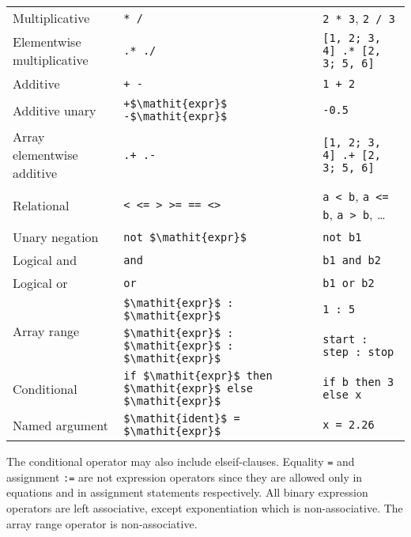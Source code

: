 \begin{table}[H]
\begin{center}
\begin{tabular}{l l l}
\hline
Multiplicative  & \lstinline!* /! & \lstinline!2 * 3!, \lstinline!2 / 3!\\
Elementwise multiplicative & \lstinline!.* ./! & \lstinline![1, 2; 3, 4] .* [2, 3; 5, 6]!\\
\hline
Additive & \lstinline!+ -! & \lstinline!1 + 2!\\
Additive unary & \lstinline!+$\mathit{expr}$ -$\mathit{expr}$! & \lstinline!-0.5!\\
Array elementwise additive & \lstinline!.+ .-! & \lstinline![1, 2; 3, 4] .+ [2, 3; 5, 6]!\\
\hline
Relational & \lstinline!< <= > >= == <>! & \lstinline!a < b!, \lstinline!a <= b!, \lstinline!a > b!, \ldots\\
\hline
Unary negation & \lstinline!not $\mathit{expr}$! & \lstinline!not b1!\\
\hline
Logical and & \lstinline!and! & \lstinline!b1 and b2!\\
\hline
Logical or & \lstinline!or! & \lstinline!b1 or b2!\\
\hline
\multirow{2}{*}{Array range} & \lstinline!$\mathit{expr}$ : $\mathit{expr}$! & \lstinline!1 : 5!\\
                             & \lstinline!$\mathit{expr}$ : $\mathit{expr}$ : $\mathit{expr}$! & \lstinline!start : step : stop!\\
\hline
Conditional & \lstinline!if $\mathit{expr}$ then $\mathit{expr}$ else $\mathit{expr}$! & \lstinline!if b then 3 else x!\\
\hline
Named argument & \lstinline!$\mathit{ident}$ = $\mathit{expr}$! & \lstinline!x = 2.26!\\
\hline
\end{tabular}
\end{center}
\end{table}

The conditional operator may also include elseif-clauses. Equality \lstinline!=! and
assignment \lstinline!:=! are not expression operators since they are allowed only
in equations and in assignment statements respectively. All binary
expression operators are left associative, except exponentiation which
is non-associative. The array range operator is non-associative.

